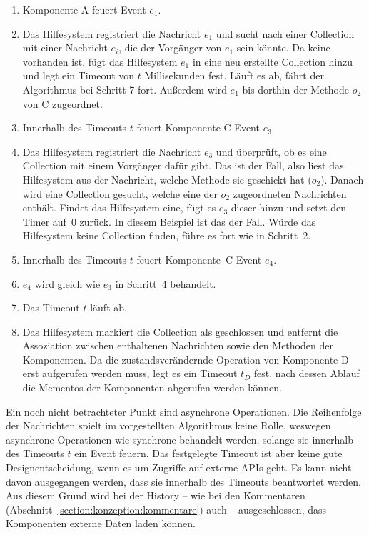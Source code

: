 \documentclass[
	headsepline,
	footsepline,
	fontsize=12pt,
	bibliography=totoc
]{scrbook}
\begin{document}
\begin{enumerate}
	\item Komponente A feuert Event $e_1$.
	\item Das Hilfesystem registriert die Nachricht $e_1$ und sucht nach einer Collection mit einer Nachricht $e_i$, die der Vorgänger von $e_1 $ sein könnte. Da keine vorhanden ist, fügt das Hilfesystem $e_1$ in eine neu erstellte Collection hinzu und legt ein Timeout von $t$ Millisekunden fest. Läuft es ab, fährt der Algorithmus bei Schritt 7 fort. Außerdem wird $e_1$ bis dorthin der Methode $o_2$ von C zugeordnet.
	\item Innerhalb des Timeouts $t$ feuert Komponente C Event $e_3$.
	\item Das Hilfesystem registriert die Nachricht $e_3$ und überprüft, ob es eine Collection mit einem Vorgänger dafür gibt. Das ist der Fall, also liest das Hilfesystem aus der Nachricht, welche Methode sie geschickt hat ($o_2$). Danach wird eine Collection gesucht, welche eine der $o_2$ zugeordneten Nachrichten enthält. Findet das Hilfesystem eine, fügt es $e_3$ dieser hinzu und setzt den Timer auf~0 zurück. In diesem Beispiel ist das der Fall. Würde das Hilfesystem keine Collection finden, führe es fort wie in Schritt~2.
	\item Innerhalb des Timeouts $t$ feuert Komponente~C Event $e_4$.
	\item $e_4$ wird gleich wie $e_3$ in Schritt~4 behandelt.
	\item Das Timeout $t$ läuft ab.
	\item Das Hilfesystem markiert die Collection als geschlossen und entfernt die Assoziation zwischen enthaltenen Nachrichten sowie den Methoden der Komponenten. Da die zustandsverändernde Operation von Komponente D erst aufgerufen werden muss, legt es ein Timeout $t_D$ fest, nach dessen Ablauf die Mementos der Komponenten abgerufen werden können.
\end{enumerate}


Ein noch nicht betrachteter Punkt sind asynchrone Operationen. Die Reihenfolge der Nachrichten spielt im vorgestellten Algorithmus keine Rolle, weswegen asynchrone Operationen wie synchrone behandelt werden, solange sie innerhalb des Timeouts $t$ ein Event feuern. Das festgelegte Timeout ist aber keine gute Designentscheidung, wenn es um Zugriffe auf externe APIs geht. Es kann nicht davon ausgegangen werden, dass sie innerhalb des Timeouts beantwortet werden. Aus diesem Grund wird bei der History -- wie bei den Kommentaren (Abschnitt~\ref{section:konzeption:kommentare}) auch -- ausgeschlossen, dass Komponenten externe Daten laden können.
\end{document}
